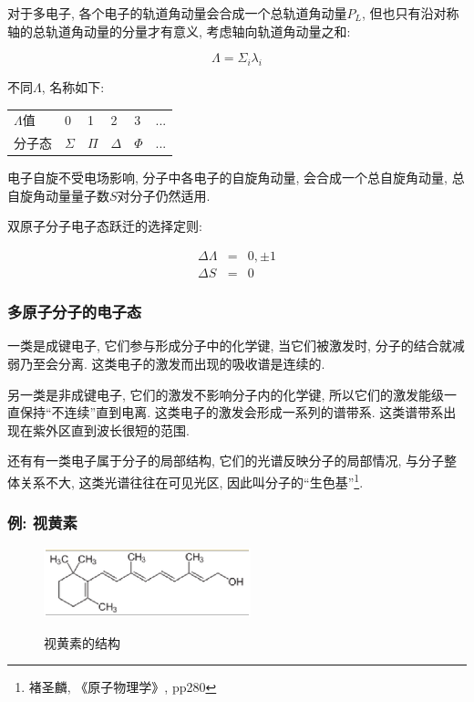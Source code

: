 对于多电子, 各个电子的轨道角动量会合成一个总轨道角动量$P_L$,
但也只有沿对称轴的总轨道角动量的分量才有意义,
考虑轴向轨道角动量之和:

\begin{equation*}
    \Lambda = \Sigma_i \lambda_i
\end{equation*}

不同$\Lambda$, 名称如下:

\begin{center}
\begin{tabular}{|l|l|l|l|l|l|}
  \hline
  $\Lambda$值 & 0 & 1 & 2 & 3 & ... \\
  分子态 & $\Sigma$ & $\Pi$ & $\Delta$ & $\Phi$ & ... \\
  \hline
\end{tabular}
\end{center}

电子自旋不受电场影响, 分子中各电子的自旋角动量,
会合成一个总自旋角动量, 总自旋角动量量子数$S$对分子仍然适用.

双原子分子电子态跃迁的选择定则:

\begin{eqnarray*}
\Delta \Lambda &=& 0, \pm 1 \\
\Delta S &=& 0
\end{eqnarray*}


\subsubsection*{多原子分子的电子态}


一类是成键电子, 它们参与形成分子中的化学键, 当它们被激发时,
分子的结合就减弱乃至会分离. 这类电子的激发而出现的吸收谱是连续的.

另一类是非成键电子, 它们的激发不影响分子内的化学键,
所以它们的激发能级一直保持``不连续''直到电离.
这类电子的激发会形成一系列的谱带系.
这类谱带系出现在紫外区直到波长很短的范围.

还有有一类电子属于分子的局部结构, 它们的光谱反映分子的局部情况,
与分子整体关系不大, 这类光谱往往在可见光区,
因此叫分子的``生色基''\footnote{褚圣麟, 《原子物理学》, pp280}.

\subsubsection*{例: 视黄素}

\begin{figure}[h]
\begin{center}
  \includegraphics[width=6cm]{Spectrum/retinol.ps}\\
  \caption{视黄素的结构}\label{structure of retinol}
\end{center}
\end{figure}


